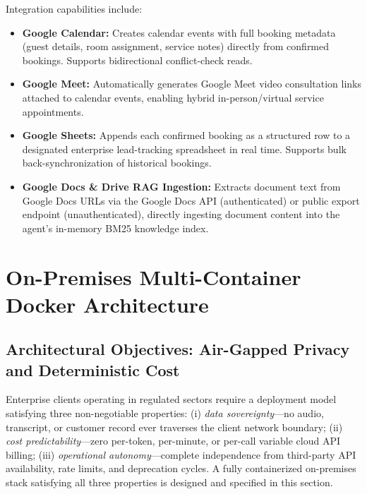 \documentclass[11pt,a4paper]{article}
\begin{document}
Integration capabilities include:
\begin{itemize}[leftmargin=*]
    \item \textbf{Google Calendar:} Creates calendar events with full booking metadata (guest details, room assignment, service notes) directly from confirmed bookings. Supports bidirectional conflict-check reads.
    \item \textbf{Google Meet:} Automatically generates Google Meet video consultation links attached to calendar events, enabling hybrid in-person/virtual service appointments.
    \item \textbf{Google Sheets:} Appends each confirmed booking as a structured row to a designated enterprise lead-tracking spreadsheet in real time. Supports bulk back-synchronization of historical bookings.
    \item \textbf{Google Docs \& Drive RAG Ingestion:} Extracts document text from Google Docs URLs via the Google Docs API (authenticated) or public export endpoint (unauthenticated), directly ingesting document content into the agent's in-memory BM25 knowledge index.
\end{itemize}

\section{On-Premises Multi-Container Docker Architecture}
\label{sec:docker}

\subsection{Architectural Objectives: Air-Gapped Privacy and Deterministic Cost}
\label{subsec:docker_objectives}

Enterprise clients operating in regulated sectors require a deployment model satisfying three non-negotiable properties: (i) \textit{data sovereignty}---no audio, transcript, or customer record ever traverses the client network boundary; (ii) \textit{cost predictability}---zero per-token, per-minute, or per-call variable cloud API billing; (iii) \textit{operational autonomy}---complete independence from third-party API availability, rate limits, and deprecation cycles. A fully containerized on-premises stack satisfying all three properties is designed and specified in this section.
\end{document}
